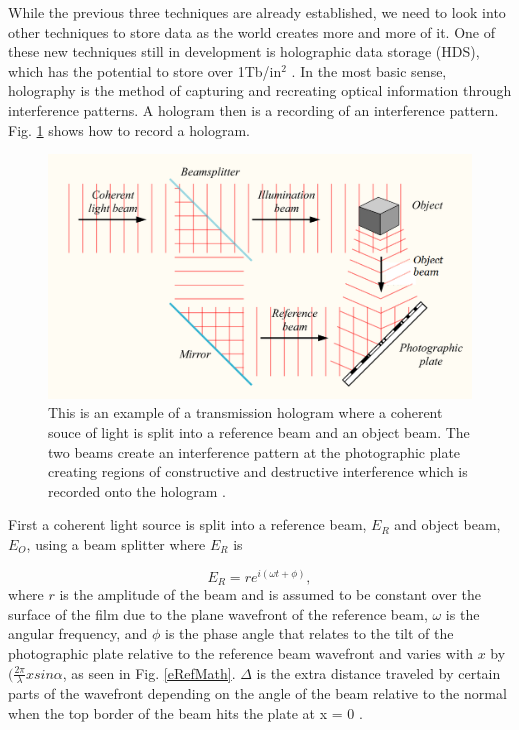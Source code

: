 \documentclass[ notitlepage, numerical, 11pt]{revtex4-1} %
\begin{document}
While the previous three techniques are already established, we need to look into other techniques to store data as the world creates more and more of it. One of these new techniques still in development is holographic data storage (HDS), which has the potential to store over 1Tb/in$^2$ \cite{HDS}. In the most basic sense, holography is the method of capturing and recreating optical information through interference patterns. A hologram then is a recording of an interference pattern. Fig. \ref{create} shows how to record a hologram. 

\begin{figure}[H]
\centerline{\includegraphics[scale=.5]{create.png}}
\caption{This is an example of a transmission hologram where a coherent souce of light is split into a reference beam and an object beam. The two beams create an interference pattern at the photographic plate creating regions of constructive and destructive interference which is recorded onto the hologram \cite{wikiHolo}.}
\label{create}
\end{figure} 
First a coherent light source is split into a reference beam, $E_R$ and object beam, $E_O$, using a beam splitter where $E_R$ is

\begin{equation}
E_{R} = re^{i(\omega t + \phi)},
\label{eRef}
\end{equation}
where $r$ is the amplitude of the beam and is assumed to be constant over the surface of the film due to the plane wavefront of the reference beam, $\omega$ is the angular frequency, and $\phi$ is the phase angle that relates to the tilt of the photographic plate relative to the reference beam wavefront and varies with $x$ by $(\frac{2\pi}{\lambda}xsin\alpha$, as seen in Fig. \ref{eRefMath}. $\Delta$ is the extra distance traveled by certain parts of the wavefront depending on the angle of the beam relative to the normal when the top border of the beam hits the plate at x = 0 \cite{optics}.
\end{document}
